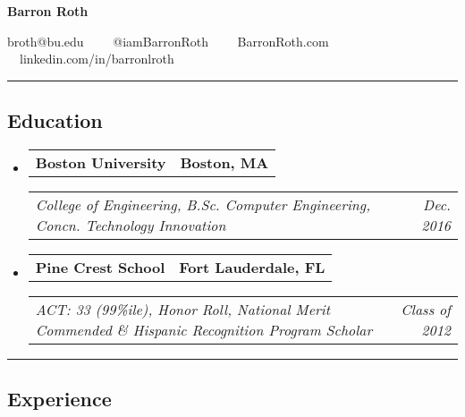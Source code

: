 \documentclass[10pt]{article}
\makeatletter
\newcommand{\headerrow}[2]
{\begin{tabular*}{\linewidth}{l@{\extracolsep{\fill}}r}
	#1 &
	#2 \\
\end{tabular*}}
\makeatother
\begin{document}
\begin{center}
{\LARGE \textbf{Barron Roth}}

broth@bu.edu\ \ \textbullet
\ \ @iamBarronRoth\ \ \textbullet
\ \ BarronRoth.com\ \ \textbullet
\ \ linkedin.com/in/barronlroth

\end{center}

\hrule
\vspace{-0.9em}

\subsection*{Education}

\begin{itemize}
	\parskip=0.001em
	
	\item 
	\headerrow
	{\textbf{Boston University}}
	{\textbf{Boston, MA}}
	\headerrow
	{\emph{College of Engineering, B.Sc. Computer Engineering, Concn. Technology Innovation}}
	{\emph{Dec. 2016}}
	
	\item 
	\headerrow
	{\textbf{Pine Crest School}}
	{\textbf{Fort Lauderdale, FL}}
	\headerrow
	{\emph{ACT: 33 (99\%ile), Honor Roll, National Merit Commended \& Hispanic Recognition Program Scholar}}
	{\emph{Class of 2012}}
	
\end{itemize}


\hrule
\vspace{-0.9em}


\subsection*{Experience}
\end{document}
